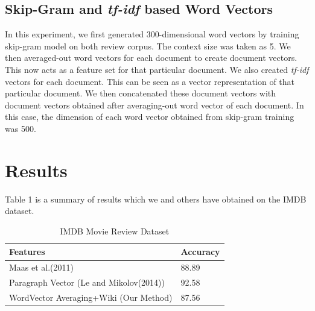 \def\DevnagVersion{2.15}\documentclass[11pt]{article}
\begin{document}
\subsection{Skip-Gram and \emph{tf-idf} based Word Vectors}
In this experiment, we first generated 300-dimensional word vectors by training skip-gram model on both review corpus. The context size was taken as 5. We then averaged-out word vectors for each document to create document vectors. This now acts as a feature set for that particular document.
We also created \emph{tf-idf} vectors for each document. This can be seen as a vector representation of that particular document. We then concatenated these document vectors with document vectors obtained after averaging-out word vector of each document. In this case, the dimension of each word vector obtained from skip-gram training was 500.


\section{Results}

Table 1 is a summary of results which we and others have obtained on the IMDB dataset.
\begin {table}[H]
\small
\begin{tabular}{ | p{5.5cm} | l | }
\hline
\textbf{Features} & \textbf{Accuracy} \\ \hline
Maas et al.(2011) & 88.89\\ \hline
Paragraph Vector (Le and Mikolov(2014)) & 92.58\\ \hline
WordVector Averaging+Wiki (Our Method) & 87.56\\ \hline
\end{tabular}
\caption {IMDB Movie Review Dataset}
\end{table}
\end{document}
